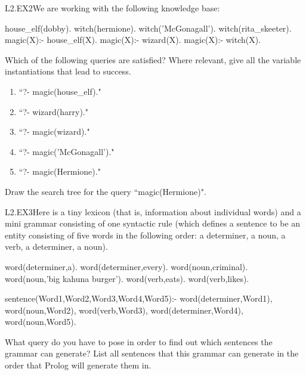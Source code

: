 \begin{LPNexercise}{L2.EX2}We are working with the following knowledge base:
\begin{LPNcodedisplay}
house_elf(dobby).
witch(hermione).
witch('McGonagall').
witch(rita_skeeter).
magic(X):- house_elf(X).
magic(X):- wizard(X).
magic(X):- witch(X).
\end{LPNcodedisplay}


Which of the following queries are satisfied? Where relevant, give all
the variable instantiations that lead to success.
\begin{enumerate}
\item{}``?- magic(house\_elf)."
\item{}``?- wizard(harry)."
\item{}``?- magic(wizard)."
\item{}``?- magic('McGonagall')."
\item{}``?- magic(Hermione)."
\end{enumerate}
Draw the search tree for the query ``magic(Hermione)".
\end{LPNexercise}


\begin{LPNexercise}{L2.EX3}Here is a tiny lexicon
(that is, information about individual words) and a mini grammar
consisting of one syntactic rule (which defines a sentence to be an
entity consisting of five words in the following order: a determiner,
a noun, a verb, a determiner, a noun).

\begin{LPNcodedisplay}
word(determiner,a).
word(determiner,every).
word(noun,criminal).
word(noun,'big kahuna burger').
word(verb,eats).
word(verb,likes).

sentence(Word1,Word2,Word3,Word4,Word5):-
   word(determiner,Word1),
   word(noun,Word2),
   word(verb,Word3),
   word(determiner,Word4),
   word(noun,Word5).
\end{LPNcodedisplay}
What query do you have to pose in order to find out which sentences
the grammar can generate?  List all sentences that this grammar can
generate in the order that Prolog will generate them in.
\end{LPNexercise}



